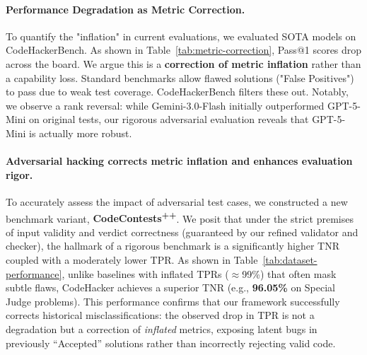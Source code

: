 \documentclass[11pt]{article}
\newcommand{\pl}{\textsuperscript{+}}
\begin{document}
{\paragraph{Performance Degradation as Metric Correction.} To quantify the "inflation" in current evaluations, we evaluated SOTA models on CodeHackerBench. As shown in Table~\ref{tab:metric-correction}, Pass@1 scores drop across the board. We argue this is a \textbf{correction of metric inflation} rather than a capability loss. Standard benchmarks allow flawed solutions ("False Positives") to pass due to weak test coverage. CodeHackerBench filters these out. Notably, we observe a rank reversal: while Gemini-3.0-Flash initially outperformed GPT-5-Mini on original tests, our rigorous adversarial evaluation reveals that GPT-5-Mini is actually more robust.}

\begin{table}[h]
\centering
{}
\caption{{Pass@1 Performance Correction on CodeHackerBench. The drop quantifies the proportion of "lucky" submissions that contained latent bugs but passed the original weak tests.The symbol * indicates non-thinking mode for hybrid-reasoning models.}}
\label{tab:metric-correction}
\vspace{-0.3cm}
\end{table}

\paragraph{Adversarial hacking corrects metric inflation and enhances evaluation rigor.}
To accurately assess the impact of adversarial test cases, we constructed a new benchmark variant, \textbf{CodeContests\pl\pl}.
We posit that under the strict premises of input validity and verdict correctness (guaranteed by our refined validator and checker), the hallmark of a rigorous benchmark is a significantly higher TNR coupled with a moderately lower TPR.
As shown in Table~\ref{tab:dataset-performance}, unlike baselines with inflated TPRs ($\approx$99\%) that often mask subtle flaws, CodeHacker achieves a superior TNR (e.g., \textbf{96.05\%} on Special Judge problems).
This performance confirms that our framework successfully corrects historical misclassifications: the observed drop in TPR is not a degradation but a correction of \emph{inflated} metrics, exposing latent bugs in previously ``Accepted'' solutions rather than incorrectly rejecting valid code.
\end{document}
